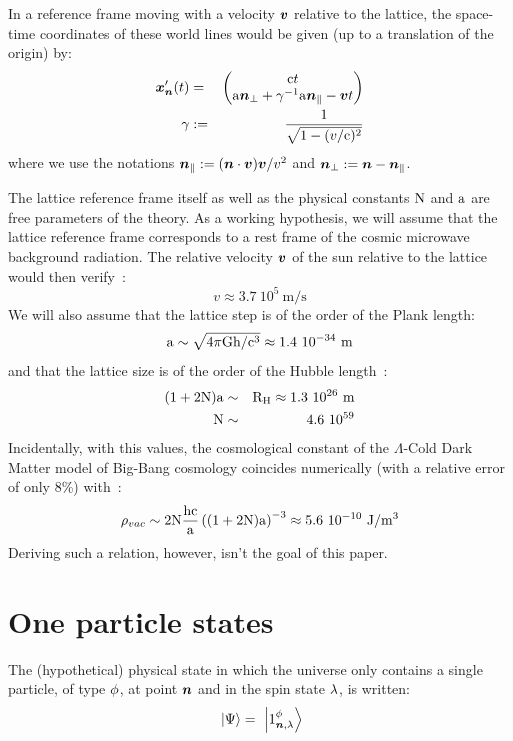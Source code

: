 \documentclass[10pt,a4paper,twoside,openany]{book}
\begin{document}
In a reference frame moving with a velocity $\sv v$ relative to the lattice, the space-time coordinates of these world lines would be given (up to a translation of the origin) by:
\begin{eqnarray*}
\wltp \n t & = & \matrix{\c t \\ \a  \n_\perp + \gamma^{-1} \a  \n_\parallel - \sv v t} \\
\gamma & \eqdef & \frac 1 {\sqrt{1 - (v / \c)^2}}
\end{eqnarray*}
where we use the notations $\n_\parallel \eqdef ( \n \ssp \sv v ) \sv v / v^2$ and $\n_\perp \eqdef \n - \n_\parallel$.

The lattice reference frame itself as well as the physical constants $\N$ and $\a$ are free parameters of the theory. As a working hypothesis, we will assume that the lattice reference frame corresponds to a rest frame of the cosmic microwave background radiation. The relative velocity $\sv v$ of the sun relative to the lattice would then verify~\cite{Kogut1993}:
\begin{equation*}
v \approx 3.7~10^5\ \mathrm m / \mathrm s
\end{equation*}
We will also assume that the lattice step is of the order of the Plank length:
\begin{equation*}
\a \sim \sqrt{4\pi\G \h/\c^3}\approx1.4~10^{-34}\ \mathrm m
\end{equation*}
and that the lattice size is of the order of the Hubble length~\cite{Freedman2001}:
\begin{eqnarray*}
(1+2 \N) \a & \sim & \RH\approx1.3\ 10^{26}\ \mathrm m\\
\N & \sim & 4.6~10^{59}
\end{eqnarray*}
Incidentally, with this values, the cosmological constant of the $\Lambda$-Cold Dark Matter model of Big-Bang cosmology coincides numerically (with a relative error of only 8\%) with~\cite{Komatsu2010}:
\begin{equation*}
\rho_{vac} \sim 2 \N \frac{\h \c}{\a} \left( ( 1 + 2 \N ) \a \right)^{-3} \approx 5.6~10^{-10}\ \mathrm J / \mathrm m^3
\end{equation*}
Deriving such a relation, however, isn't the goal of this paper.

\section{One particle states}

 The (hypothetical) physical state in which the universe only contains a single particle, of type $\pt$, at point $\n$ and in the spin state $\sp$, is written:
\begin{equation*}
\ket{\Psi} = \ketX 1 \pt \n \sp
\end{equation*}
\end{document}
